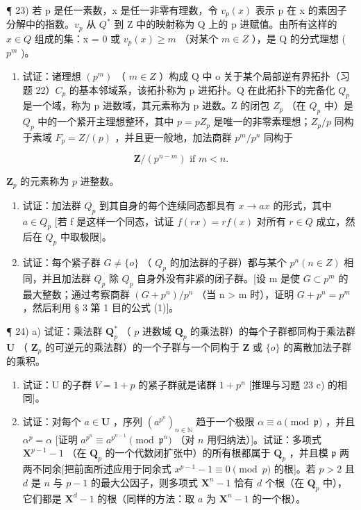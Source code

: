 ¶ 23) 若 p 是任一素数，x 是任一非零有理数，令 \(v_{p}(x)\) 表示 p 在 x 的素因子分解中的指数。\(v_{p}\) 从 \(Q^{*}\) 到 Z 中的映射称为 Q 上的 p 进赋值。由所有这样的 \(x \in Q\) 组成的集：x = 0 或 \(v_{p}(x) \geqslant m\) （对某个 \(m \in Z\) ），是 Q 的分式理想 ( \(p^{m}\) )。

\begin{enumerate}
\def\labelenumi{\alph{enumi})}
\tightlist
\item
  试证：诸理想 \((p^{m})\) （ \(m \in Z\) ）构成 Q 中 o 关于某个局部逆有界拓扑（习题 22）\(C_{p}\) 的基本邻域系，该拓扑称为 p 进拓扑。Q 在此拓扑下的完备化 \(Q_{p}\) 是一个域，称为 p 进数域，其元素称为 p 进数。Z 的闭包 \(Z_{p}\) （在 \(Q_{p}\) 中）是 \(Q_{p}\) 中的一个紧开主理想整环，其中 \(p = pZ_{p}\) 是唯一的非零素理想；\(Z_{p}/p\) 同构于素域 \(F_{p} = Z/(p)\) ，并且更一般地，加法商群 \(p^{m}/p^{n}\) 同构于
\end{enumerate}

\[
\mathbf {Z} / (p ^ {n - m}) \text {   if   } m <   n.
\]

\(\mathbf{Z}_p\) 的元素称为 \(p\) 进整数。

\begin{enumerate}
\def\labelenumi{\alph{enumi})}
\setcounter{enumi}{1}
\item
  试证：加法群 \(Q_{p}\) 到其自身的每个连续同态都具有 \(x \to ax\) 的形式，其中 \(a \in Q_{p}\) {[}若 f 是这样一个同态，试证 \(f(rx) = rf(x)\) 对所有 \(r \in Q\) 成立，然后在 \(Q_{p}\) 中取极限{]}。
\item
  试证：每个紧子群 \(G \neq \{o\}\) （ \(Q_{p}\) 的加法群的子群）都与某个 \(p^{n} (n \in Z)\) 相同，并且加法群 \(Q_{p}\) 除 \(Q_{p}\) 自身外没有非紧的闭子群。{[}设 m 是使 \(G \subset p^{m}\) 的最大整数；通过考察商群 \((G + p^{n})/p^{n}\) （当 n \textgreater{} m 时），证明 \(G + p^{n} = p^{m}\) ，然后利用 § 3 第 1 目的公式 (1){]}。
\end{enumerate}

¶ 24) a) 试证：乘法群 \(\mathbf{Q}_p^*\) （ \(p\) 进数域 \(\mathbf{Q}_p\) 的乘法群）的每个子群都同构于乘法群 \(\mathbf{U}\) （ \(\mathbf{Z}_p\) 的可逆元的乘法群）的一个子群与一个同构于 \(\mathbf{Z}\) 或 \(\{o\}\) 的离散加法子群的乘积。

\begin{enumerate}
\def\labelenumi{\alph{enumi})}
\setcounter{enumi}{1}
\item
  试证：U 的子群 \(V = 1 + p\) 的紧子群就是诸群 \(1 + p^{n}\) {[}推理与习题 23 c) 的相同{]}。
\item
  试证：对每个 \(a \in \mathbf{U}\) ，序列 \((a^{p^n})_{n \in \mathbb{N}}\) 趋于一个极限 \(\alpha \equiv a \pmod{\mathfrak{p}}\) ，并且 \(\alpha^p = \alpha\) {[}证明 \(a^{p^n} \equiv a^{p^{n-1}} \pmod{\mathfrak{p}^n}\) （对 \(n\) 用归纳法）{]}。试证：多项式 \(\mathbf{X}^{p-1} - 1\) （在 \(\mathbf{Q}_p\) 的一个代数闭扩张中）的所有根都属于 \(\mathbf{Q}_p\) ，并且模 \(\mathfrak{p}\) 两两不同余{[}把前面所述应用于同余式 \(x^{p-1} - 1 \equiv 0 \pmod{p}\) 的根{]}。若 \(p > 2\) 且 \(d\) 是 \(n\) 与 \(p - 1\) 的最大公因子，则多项式 \(\mathbf{X}^n - 1\) 恰有 \(d\) 个根（在 \(\mathbf{Q}_p\) 中），它们都是 \(\mathbf{X}^d - 1\) 的根（同样的方法：取 \(a\) 为 \(\mathbf{X}^n - 1\) 的一个根）。
\end{enumerate}

